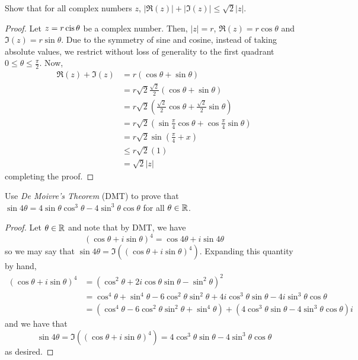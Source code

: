 \documentclass[tikz]{agony}
\begin{document}
\question Show that for all complex numbers $z$, $|\Re(z)|+|\Im(z)|\leq\sqrt{2}|z|$.
\begin{proof}
  Let $z = r\operatorname{cis} \theta$ be a complex number.
  Then, $|z| = r$, $\Re(z) = r\cos\theta$ and $\Im(z) = r\sin\theta$.
  Due to the symmetry of sine and cosine, instead of taking absolute values,
  we restrict without loss of generality to the first quadrant $0 \leq \theta \leq \frac\pi2$. Now,
  \begin{align*}
    \Re(z) + \Im(z) & = r(\cos\theta + \sin\theta)                                                          \\
                    & = r\sqrt{2}\frac{\sqrt{2}}{2}(\cos\theta + \sin\theta)                                \\
                    & = r\sqrt{2}\left( \frac{\sqrt{2}}{2}\cos\theta + \frac{\sqrt{2}}{2}\sin\theta \right) \\
                    & = r\sqrt{2}\left( \sin\frac\pi4\cos\theta + \cos\frac\pi4\sin\theta \right)           \\
                    & = r\sqrt{2}\sin\left(\frac\pi4 + x\right)                                             \\
                    & \leq r\sqrt{2}(1)                                                                     \\
                    & = \sqrt{2}|z|
  \end{align*}
  completing the proof.
\end{proof}


\question Use \emph{De Moivre's Theorem} (DMT) to prove that
$\sin 4\theta = 4\sin\theta\cos^3\theta - 4\sin^3\theta\cos\theta$ for all $\theta\in\mathbb{R}$.
\begin{proof}
  Let $\theta \in \mathbb{R}$ and note that by DMT, we have
  \[ (\cos\theta + i\sin\theta)^4 = \cos 4\theta + i\sin 4\theta \]
  so we may say that $\sin 4\theta = \Im((\cos\theta + i\sin\theta)^4)$.
  Expanding this quantity by hand,
  \begin{align*}
    (\cos\theta + i\sin\theta)^4
     & = (\cos^2 \theta + 2i\cos\theta\sin\theta - \sin^2\theta)^2                                                        \\
     & = \cos^4\theta + \sin^4\theta - 6\cos^2\theta\sin^2\theta + 4i\cos^3\theta\sin\theta - 4i\sin^3\theta\cos\theta    \\
     & = (\cos^4\theta - 6\cos^2\theta\sin^2\theta + \sin^4\theta) + (4\cos^3\theta\sin\theta - 4\sin^3\theta\cos\theta)i
  \end{align*}
  and we have that
  \[ \sin 4\theta = \Im((\cos\theta + i\sin\theta)^4) = 4\cos^3\theta\sin\theta - 4\sin^3\theta\cos\theta \]
  as desired.
\end{proof}
\end{document}
